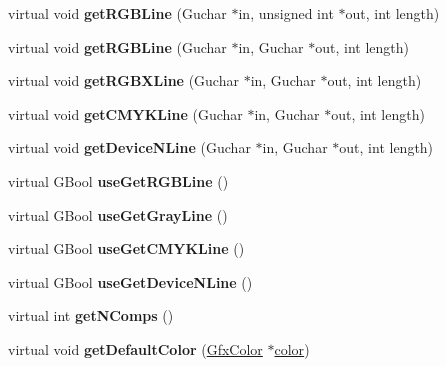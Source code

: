 \begin{DoxyCompactItemize}
\item 
\mbox{\label{class_gfx_device_gray_color_space_ab68ed4be68f9c410411202dc568c7290}} 
virtual void {\bfseries get\+R\+G\+B\+Line} (Guchar $\ast$in, unsigned int $\ast$out, int length)
\item 
\mbox{\label{class_gfx_device_gray_color_space_a1caa0bbbcbfd8d2078ec518de28f45a1}} 
virtual void {\bfseries get\+R\+G\+B\+Line} (Guchar $\ast$in, Guchar $\ast$out, int length)
\item 
\mbox{\label{class_gfx_device_gray_color_space_ab027764e5175a24f785c7c86f5bdbbfc}} 
virtual void {\bfseries get\+R\+G\+B\+X\+Line} (Guchar $\ast$in, Guchar $\ast$out, int length)
\item 
\mbox{\label{class_gfx_device_gray_color_space_a2ed0a9d52f1c3c38dd3eb0eb7d061ed3}} 
virtual void {\bfseries get\+C\+M\+Y\+K\+Line} (Guchar $\ast$in, Guchar $\ast$out, int length)
\item 
\mbox{\label{class_gfx_device_gray_color_space_a8236cdfeb38e36c114ef0aaf34bb9475}} 
virtual void {\bfseries get\+Device\+N\+Line} (Guchar $\ast$in, Guchar $\ast$out, int length)
\item 
\mbox{\label{class_gfx_device_gray_color_space_ac4fdd2338de95f2a487c635de748c905}} 
virtual G\+Bool {\bfseries use\+Get\+R\+G\+B\+Line} ()
\item 
\mbox{\label{class_gfx_device_gray_color_space_af0f4f84d3f080638d0de80d25dd85f43}} 
virtual G\+Bool {\bfseries use\+Get\+Gray\+Line} ()
\item 
\mbox{\label{class_gfx_device_gray_color_space_a90669c68c71b151a1b087883d00c71e3}} 
virtual G\+Bool {\bfseries use\+Get\+C\+M\+Y\+K\+Line} ()
\item 
\mbox{\label{class_gfx_device_gray_color_space_a342c413581d40da1925afe51a50983ae}} 
virtual G\+Bool {\bfseries use\+Get\+Device\+N\+Line} ()
\item 
\mbox{\label{class_gfx_device_gray_color_space_a92a8d91860f4c68682e6cc7ac6cb6674}} 
virtual int {\bfseries get\+N\+Comps} ()
\item 
\mbox{\label{class_gfx_device_gray_color_space_a4055dc7cb3b60d010639cc4fd91107a1}} 
virtual void {\bfseries get\+Default\+Color} (\hyperlink{struct_gfx_color}{Gfx\+Color} $\ast$\hyperlink{structcolor}{color})
\end{DoxyCompactItemize}

